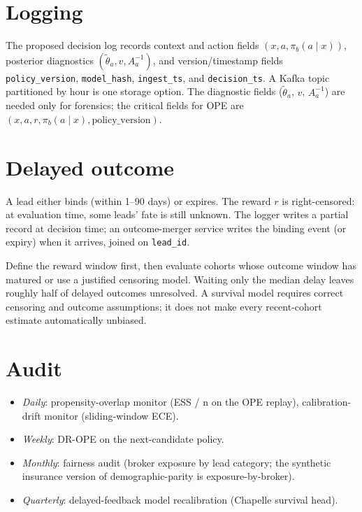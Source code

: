\documentclass[11pt,oneside]{scrbook}
\begin{document}
\section{Logging}

The proposed decision log records context and action fields
$(x, a, \pi_b(a\mid x))$, posterior diagnostics
$(\tilde\theta_a, v, A_a^{-1})$, and version/timestamp fields
\texttt{policy\_version}, \texttt{model\_hash}, \texttt{ingest\_ts}, and
\texttt{decision\_ts}. A Kafka topic partitioned by hour is one storage option.
The diagnostic fields
($\tilde\theta_a$, $v$, $A_a^{-1}$) are needed only for forensics; the
critical fields for OPE are $(x, a, r, \pi_b(a \mid x), \text{policy\_version})$.

\section{Delayed outcome}

A lead either binds (within 1--90 days) or expires. The reward $r$ is
right-censored: at evaluation time, some leads' fate is still unknown.
The logger writes a partial record at decision time; an outcome-merger
service writes the binding event (or expiry) when it arrives, joined
on \texttt{lead\_id}.

Define the reward window first, then evaluate cohorts whose outcome
window has matured or use a justified censoring model. Waiting only the
median delay leaves roughly half of delayed outcomes unresolved. A survival
model requires correct censoring and outcome assumptions; it does not
make every recent-cohort estimate automatically unbiased.

\section{Audit}

\begin{itemize}\setlength\itemsep{0pt}
  \item \emph{Daily}: propensity-overlap monitor (ESS / n on the OPE
        replay), calibration-drift monitor (sliding-window ECE).
  \item \emph{Weekly}: DR-OPE on the next-candidate policy.
  \item \emph{Monthly}: fairness audit (broker exposure by lead category;
        the synthetic insurance version of demographic-parity is exposure-by-broker).
  \item \emph{Quarterly}: delayed-feedback model recalibration (Chapelle
        survival head).
\end{itemize}
\end{document}
